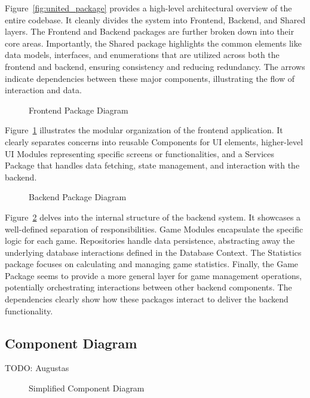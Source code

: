 \documentclass[11pt,a4paper]{article}
\newcommand{\inputdiagram}[1]{}
\newcommand{\textwidthdiagram}[2][1]{%
  \resizebox{#1\textwidth}{!}{\inputdiagram{#2}}%
}
\begin{document}
Figure~\ref{fig:united_package} provides a high-level architectural overview of the entire codebase. It cleanly divides the system into Frontend, Backend, and Shared layers. The Frontend and Backend packages are further broken down into their core areas. Importantly, the Shared package highlights the common elements like data models, interfaces, and enumerations that are utilized across both the frontend and backend, ensuring consistency and reducing redundancy. The arrows indicate dependencies between these major components, illustrating the flow of interaction and data.

\begin{figure}[H]
    \centering
    \textwidthdiagram{frontend_package.latex}
    \caption{Frontend Package Diagram}
    \label{fig:frontend_package}
\end{figure}

Figure~\ref{fig:frontend_package} illustrates the modular organization of the frontend application. It clearly separates concerns into reusable Components for UI elements, higher-level UI Modules representing specific screens or functionalities, and a Services Package that handles data fetching, state management, and interaction with the backend.

\begin{figure}[H]
    \centering
    \textwidthdiagram{backend_package.latex}
    \caption{Backend Package Diagram}
    \label{fig:backend_package}
\end{figure}

Figure~\ref{fig:backend_package} delves into the internal structure of the backend system. It showcases a well-defined separation of responsibilities. Game Modules encapsulate the specific logic for each game. Repositories handle data persistence, abstracting away the underlying database interactions defined in the Database Context. The Statistics package focuses on calculating and managing game statistics. Finally, the Game Package seems to provide a more general layer for game management operations, potentially orchestrating interactions between other backend components. The dependencies clearly show how these packages interact to deliver the backend functionality.


\subsection{Component Diagram}
TODO: Augustas
\begin{figure}[H]
    \centering
    \textwidthdiagram{components_simplified_diagram.tex}
    \caption{Simplified Component Diagram}
    \label{fig:simp_component_diagram}
\end{figure}
\end{document}
